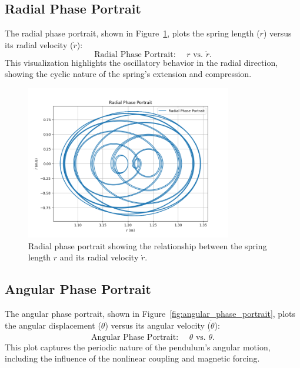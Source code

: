 \documentclass[12pt]{article}
\begin{document}
\subsection{Radial Phase Portrait}
The radial phase portrait, shown in Figure~\ref{fig:radial_phase_portrait}, plots the spring length (\( r \)) versus its radial velocity (\( \dot{r} \)):
\[
\text{Radial Phase Portrait: } \quad r \text{ vs. } \dot{r}.
\]
This visualization highlights the oscillatory behavior in the radial direction, showing the cyclic nature of the spring's extension and compression.

\begin{figure}[h!]
    \centering
    \includegraphics[width=0.8\textwidth]{radial_phase_portrait.png}
    \caption{Radial phase portrait showing the relationship between the spring length \( r \) and its radial velocity \( \dot{r} \).}
    \label{fig:radial_phase_portrait}
\end{figure}

\subsection{Angular Phase Portrait}
The angular phase portrait, shown in Figure~\ref{fig:angular_phase_portrait}, plots the angular displacement (\( \theta \)) versus its angular velocity (\( \dot{\theta} \)):
\[
\text{Angular Phase Portrait: } \quad \theta \text{ vs. } \dot{\theta}.
\]
This plot captures the periodic nature of the pendulum's angular motion, including the influence of the nonlinear coupling and magnetic forcing.
\end{document}
